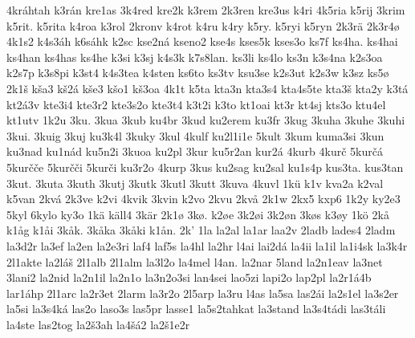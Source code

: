 {    4kráhtah
    k3rán
    kre1as
    3k4red
    kre2k
    k3rem
    2k3ren
    kre3us
    k4ri
    4k5ria
    k5rij
    3krim
    k5rit.
    k5rita
    k4roa
    k3rol
    2kronv
    k4rot
    k4ru
    k4ry
    k5ry.
    k5ryi
    k5ryn
    2k3rä
    2k3r4ø
    4k1s2
    k4s3áh
    k6sáhk
    k2sc
    kse2ná
    kseno2
    kse4s
    kses5k
    kses3o
    ks7f
    ks4ha.
    ks4hai
    ks4han
    ks4has
    ks4he
    k3si
    k3sj
    k4s3k
    k7s8lan.
    ks3li
    ks4lo
    ks3n
    k3s4na
    k2s3oa
    k2s7p
    k3s8pi
    k3st4
    k4s3tea
    k4sten
    ks6to
    ks3tv
    ksu3se
    k2s3ut
    k2s3w
    k3sz
    ks5ø
    2k1š
    kša3
    kš2á
    kše3
    kšo1
    kš3oa
    4k1t
    k5ta
    kta3n
    kta3s4
    kta4s5te
    kta3š
    kta2y
    k3tá
    kt2á3v
    kte3i4
    kte3r2
    kte3s2o
    kte3t4
    k3t2i
    k3to
    kt1oai
    kt3r
    kt4sj
    kts3o
    ktu4el
    kt1utv
    1k2u
    3ku.
    3kua
    3kub
    ku4br
    3kud
    ku2erem
    ku3fr
    3kug
    3kuha
    3kuhe
    3kuhi
    3kui.
    3kuig
    3kuj
    ku3k4l
    3kuky
    3kul
    4kulf
    ku2l1i1e
    5kult
    3kum
    kuma3si
    3kun
    ku3nad
    ku1nád
    ku5n2i
    3kuoa
    ku2pl
    3kur
    ku5r2an
    kur2á
    4kurb
    4kurč
    5kurčá
    5kurčče
    5kurčči
    5kurči
    ku3r2o
    4kurp
    3kus
    ku2sag
    ku2sal
    ku1s4p
    kus3ta.
    kus3tan
    3kut.
    3kuta
    3kuth
    3kutj
    3kutk
    3kutl
    3kutt
    3kuva
    4kuvl
    1kü
    k1v
    kva2a
    k2val
    k5van
    2kvá
    2k3ve
    k2vi
    4kvik
    3kvin
    k2vo
    2kvu
    2kvå
    2k1w
    2kx5
    kxp6
    1k2y
    ky2e3
    5kyl
    6kylo
    ky3o
    1kä
    käll4
    3kär
    2k1ø
    3kø.
    k2øe
    3k2øi
    3k2øn
    3køs
    k3øy
    1kö
    2kå
    k1åg
    k1åi
    3kåk.
    3kåka
    3kåki
    k1ån.
    2k'
    1la
    la2al
    la1ar
    laa2v
    2ladb
    lades4
    2ladm
    la3d2r
    la3ef
    la2en
    la2e3ri
    laf4
    laf5s
    la4hl
    la2hr
    l4ai
    lai2dá
    la4ii
    la1il
    la1i4sk
    la3k4r
    2l1akte
    la2láš
    2l1alb
    2l1alm
    la3l2o
    la4mel
    l4an.
    la2nar
    5land
    la2n1eav
    la3net
    3lani2
    la2nid
    la2n1il
    la2n1o
    la3n2o3si
    lan4sei
    lao5zi
    lapi2o
    lap2pl
    la2r1á4b
    lar1áhp
    2l1arc
    la2r3et
    2larm
    la3r2o
    2l5arp
    la3ru
    l4as
    la5sa
    las2ái
    la2s1el
    la3s2er
    la5si
    la3s4ká
    las2o
    laso3s
    las5pr
    lasse1
    la5s2tahkat
    la3stand
    la3s4tádi
    las3táli
    la4ste
    las2tog
    la2š3ah
    la4šá2
    la2š1e2r
}
